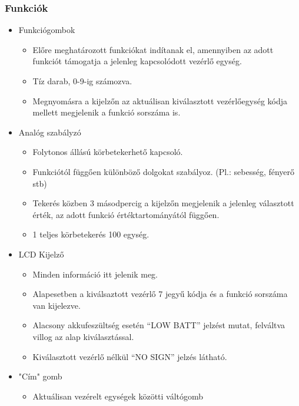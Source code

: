 \documentclass{article}
\begin{document}
\subsubsection{Funkciók}
\begin{itemize}
    \item Funkciógombok
    \begin{itemize}
        \item Előre meghatározott funkciókat indítanak el, amennyiben az adott funkciót támogatja a jelenleg kapcsolódott vezérlő egység.
        \item Tíz darab, 0-9-ig számozva.
        \item Megnyomásra a kijelzőn az aktuálisan kiválasztott vezérlőegység kódja mellett megjelenik a funkció sorszáma is.
    \end{itemize}

    \item Analóg szabályzó
    \begin{itemize}
        \item Folytonos állású körbetekerhető kapcsoló.
        \item Funkciótól függően különböző dolgokat szabályoz. (Pl.: sebesség, fényerő stb)
        \item Tekerés közben 3 másodpercig a kijelzőn megjelenik a jelenleg választott érték, az adott funkció értéktartományától függően.
        \item 1 teljes körbetekerés 100 egység.
    \end{itemize}
    
    \item LCD Kijelző
    \begin{itemize}
        \item Minden információ itt jelenik meg.
        \item Alapesetben a kiválsaztott vezérlő 7 jegyű kódja és a funkció sorszáma van kijelezve. 
        \item Alacsony akkufeszültség esetén “LOW BATT” jelzést mutat, felváltva villog az alap kiválasztással.
        \item Kiválasztott vezérlő nélkül “NO SIGN” jelzés látható.
    \end{itemize}
    
    \item "Cím" gomb
    \begin{itemize}
        \item Aktuálisan vezérelt egységek közötti váltógomb
    \end{itemize}
    

\end{itemize}
\end{document}
